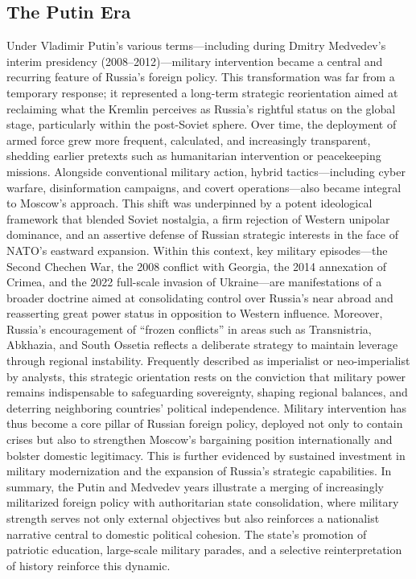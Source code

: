 \documentclass[12pt]{article}
\begin{document}
\subsection*{The Putin Era}
Under Vladimir Putin’s various terms—including during Dmitry Medvedev’s interim presidency (2008–2012)—military intervention became a central and recurring feature of Russia’s foreign policy. This transformation was far from a temporary response; it represented a long-term strategic reorientation aimed at reclaiming what the Kremlin perceives as Russia’s rightful status on the global stage, particularly within the post-Soviet sphere. Over time, the deployment of armed force grew more frequent, calculated, and increasingly transparent, shedding earlier pretexts such as humanitarian intervention or peacekeeping missions. Alongside conventional military action, hybrid tactics—including cyber warfare, disinformation campaigns, and covert operations—also became integral to Moscow’s approach.
This shift was underpinned by a potent ideological framework that blended Soviet nostalgia, a firm rejection of Western unipolar dominance, and an assertive defense of Russian strategic interests in the face of NATO’s eastward expansion. Within this context, key military episodes—the Second Chechen War, the 2008 conflict with Georgia, the 2014 annexation of Crimea, and the 2022 full-scale invasion of Ukraine—are manifestations of a broader doctrine aimed at consolidating control over Russia’s near abroad and reasserting great power status in opposition to Western influence. Moreover, Russia’s encouragement of “frozen conflicts” in areas such as Transnistria, Abkhazia, and South Ossetia reflects a deliberate strategy to maintain leverage through regional instability.
Frequently described as imperialist or neo-imperialist by analysts, this strategic orientation rests on the conviction that military power remains indispensable to safeguarding sovereignty, shaping regional balances, and deterring neighboring countries’ political independence. Military intervention has thus become a core pillar of Russian foreign policy, deployed not only to contain crises but also to strengthen Moscow’s bargaining position internationally and bolster domestic legitimacy. This is further evidenced by sustained investment in military modernization and the expansion of Russia’s strategic capabilities.
In summary, the Putin and Medvedev years illustrate a merging of increasingly militarized foreign policy with authoritarian state consolidation, where military strength serves not only external objectives but also reinforces a nationalist narrative central to domestic political cohesion. The state’s promotion of patriotic education, large-scale military parades, and a selective reinterpretation of history reinforce this dynamic.
\end{document}

